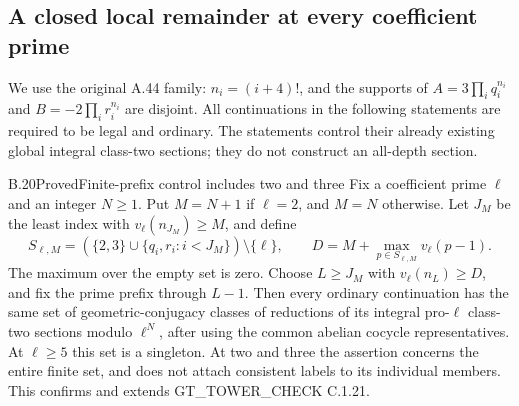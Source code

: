 \subsection{A closed local remainder at every coefficient prime}

We use the original A.44 family: $n_i=(i+4)!$, and the supports of
$A=3\prod_iq_i^{n_i}$ and $B=-2\prod_ir_i^{n_i}$ are disjoint.
All continuations in the following statements are required to be legal
and ordinary. The statements control their already existing global
integral class-two sections; they do not construct an all-depth section.

\begin{result}{B.20}{Proved}{Finite-prefix control includes two and three}
\label{coh:smallprefix}
Fix a coefficient prime $\ell$ and an integer $N\geq1$. Put
$M=N+1$ if $\ell=2$, and $M=N$ otherwise. Let $J_M$ be the least
index with $v_\ell(n_{J_M})\geq M$, and define
\[
 S_{\ell,M}=(\{2,3\}\cup\{q_i,r_i:i<J_M\})\setminus\{\ell\},
 \qquad
 D=M+\max_{p\in S_{\ell,M}}v_\ell(p-1).
\]
The maximum over the empty set is zero. Choose $L\geq J_M$ with
$v_\ell(n_L)\geq D$, and fix the prime prefix through $L-1$.
Then every ordinary continuation has the same set of geometric-conjugacy
classes of reductions of its integral pro-$\ell$ class-two sections
modulo $\ell^N$, after using the common abelian cocycle representatives.
At $\ell\geq5$ this set is a singleton. At two and three the assertion
concerns the entire finite set, and does not attach consistent labels
to its individual members. This confirms and extends
GT\_TOWER\_CHECK C.1.21.
\end{result}
